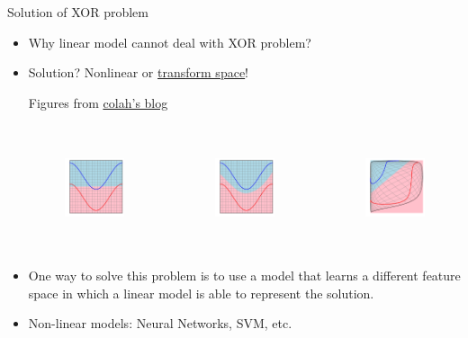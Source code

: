 \documentclass[10pt]{beamer}
\begin{document}
	\begin{frame}{Solution of XOR problem}
		\begin{itemize}
			\item Why linear model cannot deal with XOR problem?
			\onslide<2->
			\item Solution? Nonlinear or \href{http://colah.github.io/posts/2014-03-NN-Manifolds-Topology/img/spiral.1-2.2-2-2-2-2-2.gif}{\underline{transform space}}!
			\onslide<3->
			\begin{exampleblock}{Figures from \href{http://colah.github.io/posts/2014-03-NN-Manifolds-Topology/}{\underline{colah's blog}}}
				\begin{columns}[onlytextwidth]
					\begin{figure}
						\includegraphics<3->[height=8em]{figures/nonlinear-separable-1.png}
					\end{figure}
					
					\begin{figure}
						\includegraphics<3->[height=8em]{figures/nonlinear-separable-2.png}
					\end{figure}
					
					\begin{figure}
						\includegraphics<3->[height=8em]{figures/nonlinear-separable-3.png}
					\end{figure}
				\end{columns}
			\end{exampleblock}
			\item One way to solve this problem is to use a model that learns a different feature space in which a linear model is able to represent the solution.
			\onslide<5->
			\item Non-linear models: Neural Networks, SVM, etc.
		\end{itemize}
	\end{frame}
\end{document}
